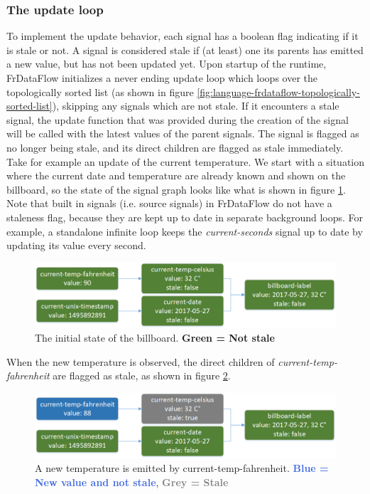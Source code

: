 \subsubsection{The update loop}

To implement the update behavior, each signal has a boolean flag indicating if it is stale or not. A signal is considered stale if (at least) one its parents has emitted a new value, but has not been updated yet. Upon startup of the runtime, FrDataFlow initializes a never ending update loop which loops over the topologically sorted list (as shown in figure \ref{fig:language-frdataflow-topologically-sorted-list}), skipping any signals which are not stale. 
If it encounters a stale signal, the update function that was provided during the creation of the signal will be called with the latest values of the parent signals. The signal is flagged as no longer being stale, and its direct children are flagged as stale immediately. Take for example an update of the current temperature. We start with a situation where the current date and temperature are already known and shown on the billboard, so the state of the signal graph looks like what is shown in figure \ref{fig:language-frdataflow-1}. 
Note that built in signals (i.e. source signals) in FrDataFlow do not have a staleness flag, because they are kept up to date in separate background loops. For example, a standalone infinite loop keeps the \textit{current-seconds} signal up to date by updating its value every second. 

\begin{figure}[h]
	\centerline{\includegraphics[width=\textwidth]{images/language-frdataflow-1.png}}
	\caption{The initial state of the billboard. \textbf{\textcolor{OliveGreen}{Green = Not stale}}}
	\label{fig:language-frdataflow-1}
\end{figure}

When the new temperature is observed, the direct children of \textit{current-temp-fahrenheit} are flagged as stale, as shown in figure \ref{fig:language-frdataflow-2}.

\begin{figure}[h]
	\centerline{\includegraphics[width=\textwidth]{images/language-frdataflow-2.png}}
	\caption{A new temperature is emitted by current-temp-fahrenheit. \textbf{\textcolor{RoyalBlue}{Blue = New value and not stale}}, \textbf{\textcolor{gray}{Grey = Stale}}}
	\label{fig:language-frdataflow-2}
\end{figure}

